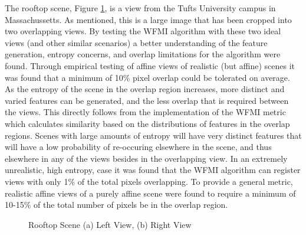 %
%
%
%
%
%

%
%
%



The rooftop scene, Figure \ref{RooftopImages}, is a view from the Tufts University campus in Massachussetts. As mentioned, this is a large image that has been cropped into two overlapping views. By testing the WFMI algorithm with these two ideal views (and other similar scenarios) a better understanding of the feature generation, entropy concerns, and overlap limitations for the algorithm were found. Through empirical testing of affine views of realistic (but affine) scenes it was found that a minimum of 10\% pixel overlap could be tolerated on average. As the entropy of  the scene in the overlap region increases, more distinct and varied features can be generated, and the less overlap that is required between the views. This directly follows from the implementation of the WFMI metric which calculates similarity based on the distributions of features in the overlap regions. Scenes with large amounts of entropy will have very distinct features that will have a low probability of re-occuring elsewhere in the scene, and thus elsewhere in any of the views besides in the overlapping view. In an extremely unrealistic, high entropy, case it was found that the WFMI algorithm can register views with only 1\% of the total pixels overlapping. To provide a general metric, realistic affine views of a purely affine scene were found to require a minimum of 10-15\% of the total number of pixels be in the overlap region.

\begin{figure}[!h]
\label{RooftopImages}
\centering
{}
\caption{Rooftop Scene (a) Left View, (b) Right View}
\end{figure}

